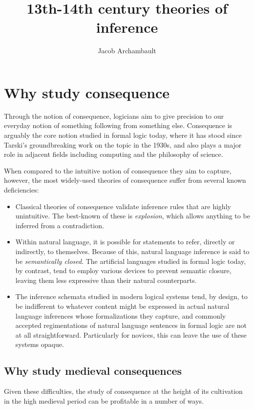 \documentclass[]{article}
\title{13th-14th century theories of inference}
\author{Jacob Archambault}
\begin{document}
\maketitle

\section{Why study consequence}
Through the notion of consequence, 
logicians aim to give precision to our everyday notion of something following from something else. 
Consequence is arguably the core notion studied in formal logic today, 
where it has stood since Tarski's groundbreaking work on the topic in the 1930s, 
and also plays a major role in adjacent fields including computing and the philosophy of science. 

When compared to the intuitive notion of consequence they aim to capture, 
however, 
the most widely-used theories of consequence suffer from several known deficiencies: 
\begin{itemize}
	\item Classical theories of consequence validate inference rules that are highly unintuitive. 
	The best-known of these is \emph{explosion}, 
	which allows anything to be inferred from a contradiction.
	\item Within natural language, 
	it is possible for statements to refer, 
	directly or indirectly, 
	to themselves. 
	Because of this, 
	natural language inference is said to be \emph{semantically closed}. 
	The artificial languages studied in formal logic today, 
	by contrast, 
	tend to employ various devices to prevent semantic closure, 
	leaving them less expressive than their natural counterparts.
	\item The inference schemata studied in modern logical systems tend, 
	by design, 
	to be indifferent to whatever content might be expressed in actual natural language inferences whose formalizations they capture, 
	and commonly accepted regimentations of natural language sentences in formal logic are not at all straightforward. 
	Particularly for novices, this can leave the use of these systems opaque. 
\end{itemize}

\subsection{Why study medieval consequences}
Given these difficulties, 
the study of consequence at the height of its cultivation in the high medieval period can be profitable in a number of ways. 
\end{document}
